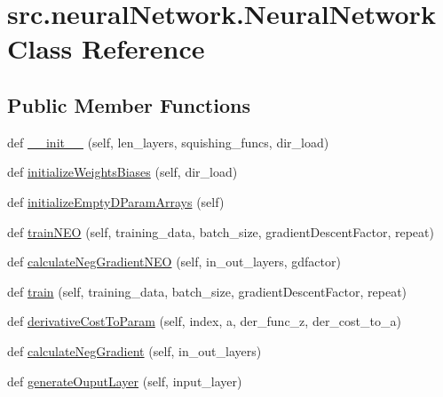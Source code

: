 \hypertarget{classsrc_1_1neuralNetwork_1_1NeuralNetwork}{}\section{src.\+neural\+Network.\+Neural\+Network Class Reference}
\label{classsrc_1_1neuralNetwork_1_1NeuralNetwork}
\subsection*{Public Member Functions}
\begin{DoxyCompactItemize}
\item 
def \hyperlink{classsrc_1_1neuralNetwork_1_1NeuralNetwork_a72b80835f72acc3c6bff018dd2f9f1a7}{\+\_\+\+\_\+init\+\_\+\+\_\+} (self, len\+\_\+layers, squishing\+\_\+funcs, dir\+\_\+load)
\item 
def \hyperlink{classsrc_1_1neuralNetwork_1_1NeuralNetwork_ad6349ea5f03d3ab38aa0ed4cd27a01b8}{initialize\+Weights\+Biases} (self, dir\+\_\+load)
\item 
def \hyperlink{classsrc_1_1neuralNetwork_1_1NeuralNetwork_a3877f22a5f71a46ecbac86894ea8d426}{initialize\+Empty\+D\+Param\+Arrays} (self)
\item 
def \hyperlink{classsrc_1_1neuralNetwork_1_1NeuralNetwork_aca6c479de85d60a5637164b7579bebc0}{train\+N\+EO} (self, training\+\_\+data, batch\+\_\+size, gradient\+Descent\+Factor, repeat)
\item 
def \hyperlink{classsrc_1_1neuralNetwork_1_1NeuralNetwork_ac5c9936546fa398f9c30c17651293d8c}{calculate\+Neg\+Gradient\+N\+EO} (self, in\+\_\+out\+\_\+layers, gdfactor)
\item 
def \hyperlink{classsrc_1_1neuralNetwork_1_1NeuralNetwork_a783b7b81a9427e302728b02ade980d18}{train} (self, training\+\_\+data, batch\+\_\+size, gradient\+Descent\+Factor, repeat)
\item 
def \hyperlink{classsrc_1_1neuralNetwork_1_1NeuralNetwork_a8bbfff35ec6a3a467bf1e39a37babae8}{derivative\+Cost\+To\+Param} (self, index, a, der\+\_\+func\+\_\+z, der\+\_\+cost\+\_\+to\+\_\+a)
\item 
def \hyperlink{classsrc_1_1neuralNetwork_1_1NeuralNetwork_a06baba93e5a4486e008c739f4492b66f}{calculate\+Neg\+Gradient} (self, in\+\_\+out\+\_\+layers)
\item 
def \hyperlink{classsrc_1_1neuralNetwork_1_1NeuralNetwork_aa315683b512adf945bf1fd54b177dc40}{generate\+Ouput\+Layer} (self, input\+\_\+layer)
\item 

\end{DoxyCompactItemize}
